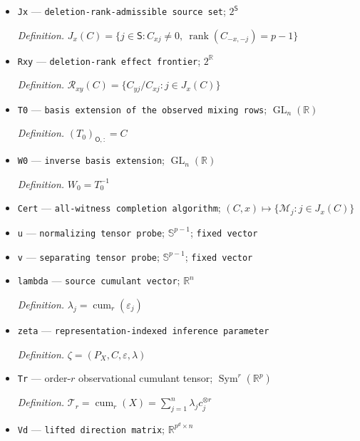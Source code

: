 \documentclass{article}
\begin{document}
\begin{itemize}
  \par\smallskip\noindent\emph{Definition.} \(\theta_{y\leftarrow x}(\mathcal M)=(Q^{-1})_{yx}/(Q^{-1})_{xx}\)
  \item \texttt{Jx} --- \texttt{deletion-\allowbreak{}rank-\allowbreak{}admissible source set}; \(2^{\mathsf S}\)
  \par\smallskip\noindent\emph{Definition.} \(J_x(C)=\{j\in\mathsf S:C_{xj}\ne0,\ \operatorname{rank}(C_{-x,-j})=p-1\}\)
  \item \texttt{Rxy} --- \texttt{deletion-\allowbreak{}rank effect frontier}; \(2^{\mathbb R}\)
  \par\smallskip\noindent\emph{Definition.} \(\mathcal R_{xy}(C)=\{C_{yj}/C_{xj}:j\in J_x(C)\}\)
  \item \texttt{T0} --- \texttt{basis extension of the observed mixing rows}; \(\operatorname{GL}_n(\mathbb R)\)
  \par\smallskip\noindent\emph{Definition.} \((T_0)_{\mathsf O,:}=C\)
  \item \texttt{W0} --- \texttt{inverse basis extension}; \(\operatorname{GL}_n(\mathbb R)\)
  \par\smallskip\noindent\emph{Definition.} \(W_0=T_0^{-1}\)
  \item \texttt{Cert} --- \texttt{all-\allowbreak{}witness completion algorithm}; \((C,x)\mapsto\{\mathcal M_j:j\in J_x(C)\}\)
  \item \texttt{u} --- \texttt{normalizing tensor probe}; \(\mathbb S^{p-1}\); \texttt{fixed vector}
  \item \texttt{v} --- \texttt{separating tensor probe}; \(\mathbb S^{p-1}\); \texttt{fixed vector}
  \item \texttt{lambda} --- \texttt{source cumulant vector}; \(\mathbb R^n\)
  \par\smallskip\noindent\emph{Definition.} \(\lambda_j=\operatorname{cum}_r(\varepsilon_j)\)
  \item \texttt{zeta} --- \texttt{representation-\allowbreak{}indexed inference parameter}
  \par\smallskip\noindent\emph{Definition.} \(\zeta=(P_X,C,\varepsilon,\lambda)\)
  \item \texttt{Tr} --- order-\(r\) observational cumulant tensor; \(\operatorname{Sym}^r(\mathbb R^p)\)
  \par\smallskip\noindent\emph{Definition.} \(\mathcal T_r=\operatorname{cum}_r(X)=\sum_{j=1}^n\lambda_j c_j^{\otimes r}\)
  \item \texttt{Vd} --- \texttt{lifted direction matrix}; \(\mathbb R^{p^d\times n}\)

\end{itemize}
\end{document}
